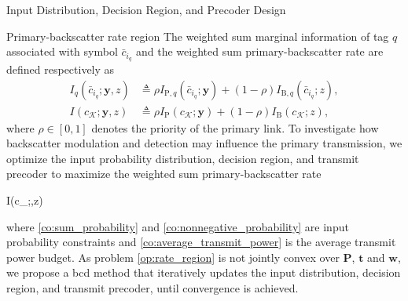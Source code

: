 \documentclass[journal]{IEEEtran}
\begin{document}
	\begin{section}{Input Distribution, Decision Region, and Precoder Design}
		\begin{subsection}{Primary-backscatter rate region}
			The weighted sum marginal information of tag $q$ associated with symbol $\bar{c}_{i_q}$ and the weighted sum primary-backscatter rate are defined respectively as
			\begin{align}
				I_q(\bar{c}_{i_q};\boldsymbol{y},z)
				& \triangleq \rho I_{\mathrm{P},q}(\bar{c}_{i_q};\boldsymbol{y}) + (1 - \rho) I_{\mathrm{B},q}(\bar{c}_{i_q};z),\label{eq:weighted_sum_marginal_information}\\
				I(c_{\mathcal{K}};\boldsymbol{y},z)
				& \triangleq \rho I_{\mathrm{P}}(c_{\mathcal{K}};\boldsymbol{y}) + (1 - \rho) I_{\mathrm{B}}(c_{\mathcal{K}};z),\label{eq:weighted_sum_rate}
			\end{align}
			where $\rho \in [0,1]$ denotes the priority of the primary link. To investigate how backscatter modulation and detection may influence the primary transmission, we optimize the input probability distribution, decision region, and transmit precoder to maximize the weighted sum primary-backscatter rate
			\begin{maxi!}
				{}{I(c_{};,z)}{\label{op:rate_region}}{\label{ob:weighted_sum_rate}}
			\end{maxi!}
			where \eqref{co:sum_probability} and \eqref{co:nonnegative_probability} are input probability constraints and \eqref{co:average_transmit_power} is the average transmit power budget. As problem \eqref{op:rate_region} is not jointly convex over $\boldsymbol{P}$, $\boldsymbol{t}$ and $\boldsymbol{w}$, we propose a \gls{bcd} method that iteratively updates the input distribution, decision region, and transmit precoder, until convergence is achieved.
		\end{subsection}


\end{section}
\end{document}
